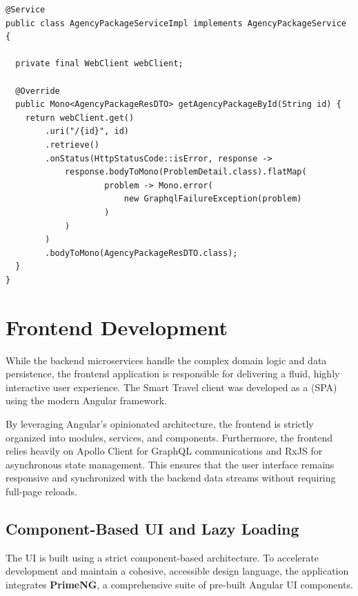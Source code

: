 \begin{lstlisting}[language=JavaExtended, caption={Reactive Inter-Service Communication via WebClient}, label={lst:bff_webclient}]
@Service
public class AgencyPackageServiceImpl implements AgencyPackageService {

  private final WebClient webClient;

  @Override
  public Mono<AgencyPackageResDTO> getAgencyPackageById(String id) {
    return webClient.get()
        .uri("/{id}", id)
        .retrieve()
        .onStatus(HttpStatusCode::isError, response ->
            response.bodyToMono(ProblemDetail.class).flatMap(
                    problem -> Mono.error(
                        new GraphqlFailureException(problem)
                    )
            )
        )
        .bodyToMono(AgencyPackageResDTO.class);
  }
}
\end{lstlisting}


\section{Frontend Development}
\label{sec:frontend_development}

While the backend microservices handle the complex domain logic and data persistence, the frontend application is responsible for delivering a fluid, highly interactive user experience. The Smart Travel client was developed as a (\gls{SPA}) using the modern Angular framework. 

By leveraging Angular's opinionated architecture, the frontend is strictly organized into modules, services, and components. Furthermore, the frontend relies heavily on Apollo Client for GraphQL communications and \gls{RxJS} for asynchronous state management. This ensures that the user interface remains responsive and synchronized with the backend data streams without requiring full-page reloads.

\subsection{Component-Based UI and Lazy Loading}

The \gls{UI} is built using a strict component-based architecture. To accelerate development and maintain a cohesive, accessible design language, the application integrates \textbf{PrimeNG}, a comprehensive suite of pre-built Angular UI components. 

